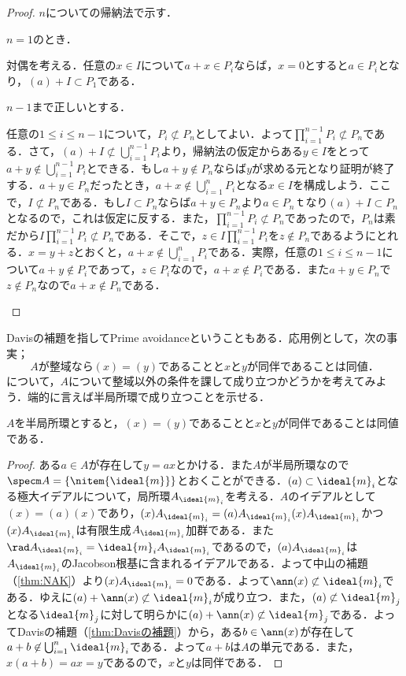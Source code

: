 \begin{proof}
	$n$についての帰納法で示す．
	
	\begin{step}
		\item $n=1$のとき．
		
		対偶を考える．任意の$x\in I$について$a+x\in P_i$ならば，$x=0$とすると$a\in P_i$となり，$(a)+I\subset P_1$である．
		
		\item $n-1$まで正しいとする．
		
		任意の$1\leq i\leq n-1$について，$P_i\not\subset P_n$としてよい．よって$\prod_{i=1}^{n-1}P_i\not\subset P_n$である．さて，$(a)+I\not\subset\bigcup_{i=1}^{n-1}P_i$より，帰納法の仮定からある$y\in I$をとって$a+y\not\in\bigcup_{i=1}^{n-1}P_i$とできる．もし$a+y\not\in P_n$ならば$y$が求める元となり証明が終了する．$a+y\in P_n$だったとき，$a+x\not\in \bigcup_{i=1}^n P_i$となる$x\in I$を構成しよう．ここで，$I\not\subset P_n$である．もし$I\subset P_n$ならば$a+y\in P_n$より$a\in P_n$ｔなり$(a)+I\subset P_n$となるので，これは仮定に反する．また，$\prod_{i=1}^{n-1}P_i\not\subset P_n$であったので，$P_n$は素だから$I\prod_{i=1}^{n-1}P_i\not\subset P_n$である．そこで，$z\in I\prod_{i=1}^{n-1}P_i$を$z\not\in P_n$であるようにとれる．$x=y+z$とおくと，$a+x\not\in\bigcup_{i=1}^n P_i$である．実際，任意の$1\leq i\leq n-1$について$a+y\not\in P_i$であって，$z\in P_i$なので，$a+x\not\in P_i$である．また$a+y\in P_n$で$z\not\in P_n$なので$a+x\not\in P_n$である．	
	\end{step}
\end{proof}

Davisの補題を指してPrime avoidanceということもある．応用例として，次の事実；
\[A\text{が整域なら}(x)=(y)\text{であることと}x\text{と}y\text{が同伴であることは同値．}\]
について，$A$について整域以外の条件を課して成り立つかどうかを考えてみよう．端的に言えば半局所環で成り立つことを示せる．

\begin{prop}\label{prop:半局所環と同伴関係}
	$A$を半局所環とすると，$(x)=(y)$であることと$x$と$y$が同伴であることは同値である．
\end{prop}

\begin{proof}
	ある$a\in A$が存在して$y=ax$とかける．また$A$が半局所環なので$\specm A=\{\nitem{\ideal{m}}\}$とおくことができる．$(a)\subset\ideal{m}_i$となる極大イデアルについて，局所環$A_{\ideal{m}_i}$を考える．$A$のイデアルとして$(x)=(a)(x)$であり，$(x)A_{\ideal{m}_i}=(a)A_{\ideal{m}_i}(x)A_{\ideal{m}_i}$かつ$(x)A_{\ideal{m}_i}$は有限生成$A_{\ideal{m}_i}$加群である．また$\rad A_{\ideal{m}_i}=\ideal{m}_iA_{\ideal{m}_i}$であるので，$(a)A_{\ideal{m}_i}$は$A_{\ideal{m}_i}$のJacobson根基に含まれるイデアルである．よって中山の補題（\ref{thm:NAK}）より$(x)A_{\ideal{m}_i}=0$である．よって$\ann (x)\not\subset\ideal{m}_i$である．ゆえに$(a)+\ann (x)\not\subset\ideal{m}_i$が成り立つ．また，$(a)\not\subset\ideal{m}_j$となる$\ideal{m}_j$に対して明らかに$(a)+\ann (x)\not\subset\ideal{m}_j$である．よってDavisの補題（\ref{thm:Davisの補題}）から，ある$b\in\ann(x)$が存在して$a+b\not\in\bigcup_{i=1}^n\ideal{m}_i$である．よって$a+b$は$A$の単元である．また，$x(a+b)=ax=y$であるので，$x$と$y$は同伴である．
\end{proof}

